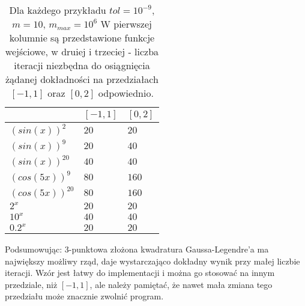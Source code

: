 \documentclass[a4paper,12pt]{article}
\begin{document}
\begin{table}[!h]\vspace*{-2ex}
\caption{\footnotesize Dla każdego przykładu $ tol = 10^{-9}$, $m=10$, $m_{max} = 10^{6}$ 
W pierwszej kolumnie są przedstawione funkcje wejściowe, w druiej i trzeciej - liczba iteracji niezbędna do osiągnięcia żądanej dokładności na przedziałach $[-1,1]$ oraz $[0,2]$ odpowiednio.} \vspace{-1.5ex}
\label{T2}
\begin{center}
\begin{small}
\begin{tabular}{|C{20ex}|C{20ex}|C{20ex}|}\hline
   & $[-1,1]$ & $[0,2]$ \\\hline
  $(sin(x))^2$ & $20$ & $20$ \\\hline
  $(sin(x))^9$ & $20$ & $40$ \\\hline
  $(sin(x))^{20}$ & $40$ & $40$ \\\hline
  $(cos(5x))^9$ & $80$ & $160$ \\\hline
  $(cos(5x))^{20}$ & $80$ & $160$ \\\hline
  $2^x$ & $20$ & $20$ \\\hline
  $10^x$ & $40$ & $40$ \\\hline
  $0.2^x$ & $20$ & $20$ \\\hline
\end{tabular}
\end{small}
\end{center}
\end{table}\vspace{-3ex}

Podsumowując: 3-punktowa złożona kwadratura Gaussa-Legendre'a ma największy możliwy rząd, daje wystarczająco dokładny wynik przy małej liczbie iteracji. Wzór jest łatwy do implementacji i można go stosować na innym przedziale, niż $[-1,1]$, ale należy pamiętać, że nawet mała zmiana tego przedziału może znacznie zwolnić program.
\end{document}
